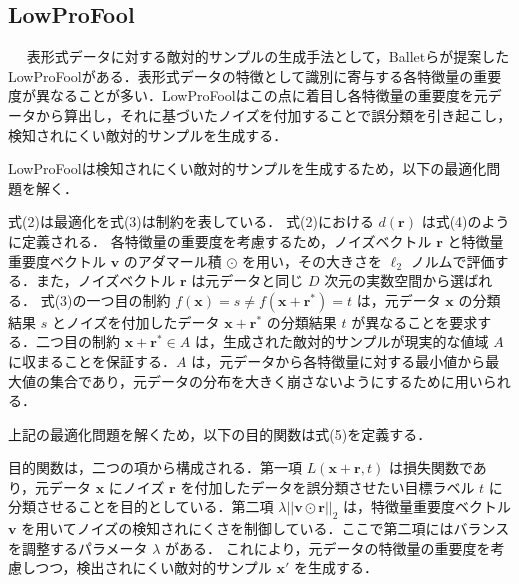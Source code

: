 \subsection{LowProFool}　%
表形式データに対する敵対的サンプルの生成手法として，Balletらが提案したLowProFool\cite{ballet2019imperceptible}がある．表形式データの特徴として識別に寄与する各特徴量の重要度が異なることが多い．LowProFoolはこの点に着目し各特徴量の重要度を元データから算出し，それに基づいたノイズを付加することで誤分類を引き起こし，検知されにくい敵対的サンプルを生成する．

LowProFoolは検知されにくい敵対的サンプルを生成するため，以下の最適化問題を解く．

式(2)は最適化を式(3)は制約を表している．
式(2)における $d(\bm{r})$ は式(4)のように定義される．
各特徴量の重要度を考慮するため，ノイズベクトル $\bm{r}$ と特徴量重要度ベクトル $\bm{v}$ のアダマール積 $\odot$ を用い，その大きさを $\ell_2$ ノルムで評価する．また，ノイズベクトル $\bm{r}$ は元データと同じ $D$ 次元の実数空間から選ばれる．
式(3)の一つ目の制約 $f(\bm{x}) = s \neq f(\bm{x}+\bm{r}^*) = t$ は，元データ $\bm{x}$ の分類結果 $s$ とノイズを付加したデータ $\bm{x}+\bm{r}^*$ の分類結果 $t$ が異なることを要求する．二つ目の制約 $\bm{x}+\bm{r}^* \in A$ は，生成された敵対的サンプルが現実的な値域 $A$ に収まることを保証する．$A$ は，元データから各特徴量に対する最小値から最大値の集合であり，元データの分布を大きく崩さないようにするために用いられる．

上記の最適化問題を解くため，以下の目的関数は式(5)を定義する．


 目的関数は，二つの項から構成される．第一項 $L(\bm{x}+\bm{r}, t)$ は損失関数であり，元データ $\bm{x}$ にノイズ $\bm{r}$ を付加したデータを誤分類させたい目標ラベル $t$ に分類させることを目的としている．第二項 $\lambda ||\bm{v} \odot \bm{r}||_2$ は，特徴量重要度ベクトル $\bm{v}$ を用いてノイズの検知されにくさを制御している．ここで第二項にはバランスを調整するパラメータ $\lambda$ がある．
 これにより，元データの特徴量の重要度を考慮しつつ，検出されにくい敵対的サンプル $\bm{x}'$ を生成する．

